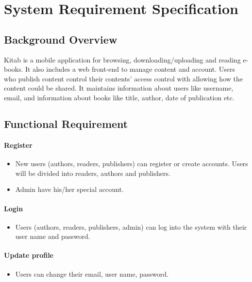 \chapter{System Requirement Specification}
\section{Background Overview}

Kitab is a mobile application for browsing, downloading/uploading and reading e-books. It also includes a web front-end to manage content and account. Users who publish content control their contents’ access control with allowing how the content could be shared. It maintains information about users like username, email, and information about books like title, author, date of publication etc.

\section{Functional Requirement}
	\subsubsection{Register}

	\begin{itemize}
		\item New users (authors, readers, publishers) can register or create accounts. Users will be divided into readers, authors and publishers.
		\item Admin have his/her special account.
	\end{itemize}

	\subsubsection{Login}
	\begin{itemize}
		\item Users (authors, readers, publishers, admin) can log into the system with their user name and password.
	\end{itemize}

	\subsubsection{Update profile}	
	\begin{itemize}
		\item Users can change their email, user name, password.
	\end{itemize}

